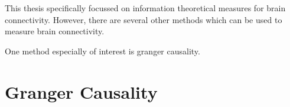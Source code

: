 This thesis specifically focussed on information theoretical measures for brain connectivity. However, there are several other methods which can be used to measure brain connectivity.

One method especially of interest is granger causality. 

\section{Granger Causality}

